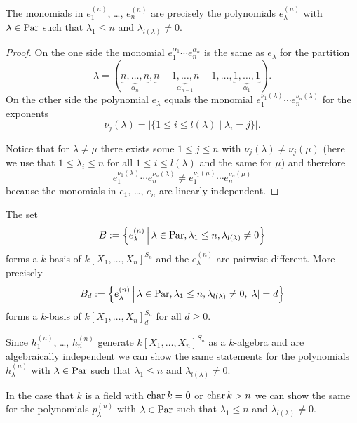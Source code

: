 \begin{prop}
 The monomials in $e^{(n)}_1$, \dots, $e^{(n)}_n$ are precisely the polynomials $e^{(n)}_\lambda$ with $\lambda \in \operatorname{Par}$ such that $\lambda_1 \leq n$ and $\lambda_{l(\lambda)} \neq 0$.
\end{prop}
\begin{proof}
 On the one side the monomial $e_1^{\alpha_1} \dotsm e_n^{\alpha_n}$ is the same as $e_\lambda$ for the partition
 \[
  \lambda = (\underbrace{n, \dotsc, n}_{\alpha_n}, \underbrace{n-1, \dotsc, n-1}_{\alpha_{n-1}}, \dotsc, \underbrace{1, \dotsc, 1}_{\alpha_1}).
 \]
 On the other side the polynomial $e_\lambda$ equals the monomial $e_1^{\nu_1(\lambda)} \dotsm e_n^{\nu_n(\lambda)}$ for the exponents
 \[
  \nu_j(\lambda) = |\{1 \leq i \leq l(\lambda) \mid \lambda_i = j\}|.
 \]
 
 Notice that for $\lambda \neq \mu$ there exists some $1 \leq j \leq n$ with $\nu_j(\lambda) \neq \nu_j(\mu)$ (here we use that $1 \leq \lambda_i \leq n$ for all $1 \leq i \leq l(\lambda)$ and the same for $\mu$) and therefore
 \[
  e_1^{\nu_1(\lambda)} \dotsm e_n^{\nu_n(\lambda)} \neq e_1^{\nu_1(\mu)} \dotsm e_n^{\nu_n(\mu)}
 \]
 because the monomials in $e_1$, \dots, $e_n$ are linearly independent.
\end{proof}


\begin{cor}
 The set
 \[
  B := \left\{ e^{(n)}_\lambda \,\middle|\, \lambda \in \operatorname{Par}, \lambda_1 \leq n, \lambda_{l(\lambda)} \neq 0 \right\}
 \]
 forms a $k$-basis of $k[X_1, \dotsc, X_n]^{S_n}$ and the $e^{(n)}_\lambda$ are pairwise different. More precisely
 \[
  B_d := \left\{ e^{(n)}_\lambda \,\middle|\, \lambda \in \operatorname{Par}, \lambda_1 \leq n, \lambda_{l(\lambda)} \neq 0, |\lambda| = d \right\}
 \]
 forms a $k$-basis of $k[X_1, \dotsc, X_n]^{S_n}_d$ for all $d \geq 0$.
\end{cor}


\begin{rem}
 Since $h^{(n)}_1$, \dots, $h^{(n)}_n$ generate $k[X_1, \dotsc, X_n]^{S_n}$ as a $k$-algebra and are algebraically independent we can show the same statements for the polynomials $h^{(n)}_\lambda$ with $\lambda \in \operatorname{Par}$ such that $\lambda_1 \leq n$ and $\lambda_{l(\lambda)} \neq 0$.
 
 In the case that $k$ is a field with $\operatorname{char} k = 0$ or $\operatorname{char} k > n$ we can show the same for the polynomials $p^{(n)}_\lambda$ with $\lambda \in \operatorname{Par}$ such that $\lambda_1 \leq n$ and $\lambda_{l(\lambda)} \neq 0$.
\end{rem}


